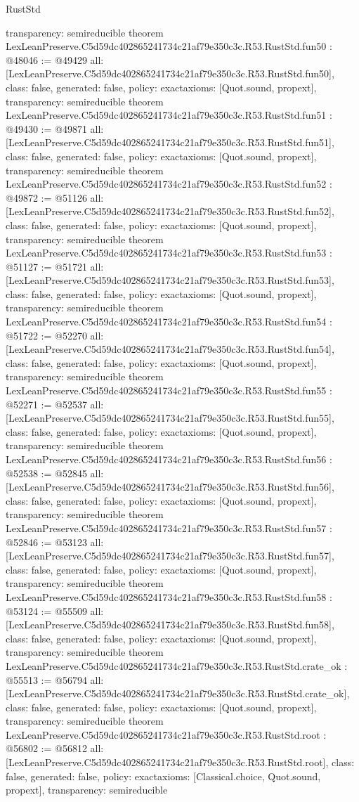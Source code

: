\begin{lexlean}{RustStd}
\begin{coremodule}
{  transparency: semireducible
}
theorem LexLeanPreserve.C5d59dc402865241734c21af79e350c3c.R53.RustStd.fun50 : @48046 := @49429 {
  all: [LexLeanPreserve.C5d59dc402865241734c21af79e350c3c.R53.RustStd.fun50],
  class: false,
  generated: false,
  policy: exact{axioms: [Quot.sound, propext]},
  transparency: semireducible
}
theorem LexLeanPreserve.C5d59dc402865241734c21af79e350c3c.R53.RustStd.fun51 : @49430 := @49871 {
  all: [LexLeanPreserve.C5d59dc402865241734c21af79e350c3c.R53.RustStd.fun51],
  class: false,
  generated: false,
  policy: exact{axioms: [Quot.sound, propext]},
  transparency: semireducible
}
theorem LexLeanPreserve.C5d59dc402865241734c21af79e350c3c.R53.RustStd.fun52 : @49872 := @51126 {
  all: [LexLeanPreserve.C5d59dc402865241734c21af79e350c3c.R53.RustStd.fun52],
  class: false,
  generated: false,
  policy: exact{axioms: [Quot.sound, propext]},
  transparency: semireducible
}
theorem LexLeanPreserve.C5d59dc402865241734c21af79e350c3c.R53.RustStd.fun53 : @51127 := @51721 {
  all: [LexLeanPreserve.C5d59dc402865241734c21af79e350c3c.R53.RustStd.fun53],
  class: false,
  generated: false,
  policy: exact{axioms: [Quot.sound, propext]},
  transparency: semireducible
}
theorem LexLeanPreserve.C5d59dc402865241734c21af79e350c3c.R53.RustStd.fun54 : @51722 := @52270 {
  all: [LexLeanPreserve.C5d59dc402865241734c21af79e350c3c.R53.RustStd.fun54],
  class: false,
  generated: false,
  policy: exact{axioms: [Quot.sound, propext]},
  transparency: semireducible
}
theorem LexLeanPreserve.C5d59dc402865241734c21af79e350c3c.R53.RustStd.fun55 : @52271 := @52537 {
  all: [LexLeanPreserve.C5d59dc402865241734c21af79e350c3c.R53.RustStd.fun55],
  class: false,
  generated: false,
  policy: exact{axioms: [Quot.sound, propext]},
  transparency: semireducible
}
theorem LexLeanPreserve.C5d59dc402865241734c21af79e350c3c.R53.RustStd.fun56 : @52538 := @52845 {
  all: [LexLeanPreserve.C5d59dc402865241734c21af79e350c3c.R53.RustStd.fun56],
  class: false,
  generated: false,
  policy: exact{axioms: [Quot.sound, propext]},
  transparency: semireducible
}
theorem LexLeanPreserve.C5d59dc402865241734c21af79e350c3c.R53.RustStd.fun57 : @52846 := @53123 {
  all: [LexLeanPreserve.C5d59dc402865241734c21af79e350c3c.R53.RustStd.fun57],
  class: false,
  generated: false,
  policy: exact{axioms: [Quot.sound, propext]},
  transparency: semireducible
}
theorem LexLeanPreserve.C5d59dc402865241734c21af79e350c3c.R53.RustStd.fun58 : @53124 := @55509 {
  all: [LexLeanPreserve.C5d59dc402865241734c21af79e350c3c.R53.RustStd.fun58],
  class: false,
  generated: false,
  policy: exact{axioms: [Quot.sound, propext]},
  transparency: semireducible
}
theorem LexLeanPreserve.C5d59dc402865241734c21af79e350c3c.R53.RustStd.crate_ok : @55513 := @56794 {
  all: [LexLeanPreserve.C5d59dc402865241734c21af79e350c3c.R53.RustStd.crate_ok],
  class: false,
  generated: false,
  policy: exact{axioms: [Quot.sound, propext]},
  transparency: semireducible
}
theorem LexLeanPreserve.C5d59dc402865241734c21af79e350c3c.R53.RustStd.root : @56802 := @56812 {
  all: [LexLeanPreserve.C5d59dc402865241734c21af79e350c3c.R53.RustStd.root],
  class: false,
  generated: false,
  policy: exact{axioms: [Classical.choice, Quot.sound, propext]},
  transparency: semireducible
}


\end{coremodule}
\end{lexlean}

